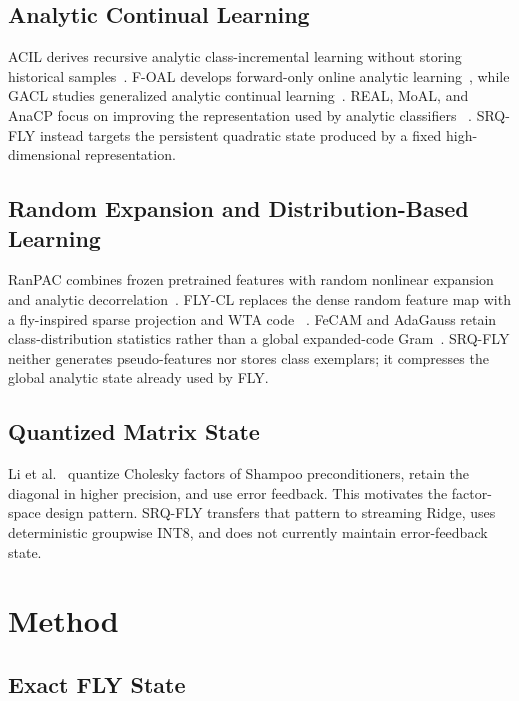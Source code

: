 \documentclass[runningheads]{llncs}
\begin{document}
\subsection{Analytic Continual Learning}

ACIL derives recursive analytic class-incremental learning without storing
historical samples~\cite{zhuang2022acil}. F-OAL develops forward-only online
analytic learning~\cite{zhuang2024foal}, while GACL studies generalized
analytic continual learning~\cite{zhuang2024gacl}. REAL, MoAL, and AnaCP focus
on improving the representation used by analytic classifiers
~\cite{he2024real,gao2025moal,momeni2025anacp}. SRQ-FLY instead targets the
persistent quadratic state produced by a fixed high-dimensional
representation.

\subsection{Random Expansion and Distribution-Based Learning}

RanPAC combines frozen pretrained features with random nonlinear expansion and
analytic decorrelation~\cite{mcdonnell2023ranpac}. FLY-CL replaces the dense
random feature map with a fly-inspired sparse projection and WTA code
~\cite{zou2026flycl}. FeCAM and AdaGauss retain class-distribution statistics
rather than a global expanded-code Gram~\cite{goswami2023fecam,rypesc2024adagauss}.
SRQ-FLY neither generates pseudo-features nor stores class exemplars; it
compresses the global analytic state already used by FLY.

\subsection{Quantized Matrix State}

Li et al.~\cite{li2025fourbit} quantize Cholesky factors of Shampoo
preconditioners, retain the diagonal in higher precision, and use error
feedback. This motivates the factor-space design pattern. SRQ-FLY transfers
that pattern to streaming Ridge, uses deterministic groupwise INT8, and does
not currently maintain error-feedback state.

\section{Method}

\subsection{Exact FLY State}
\end{document}
